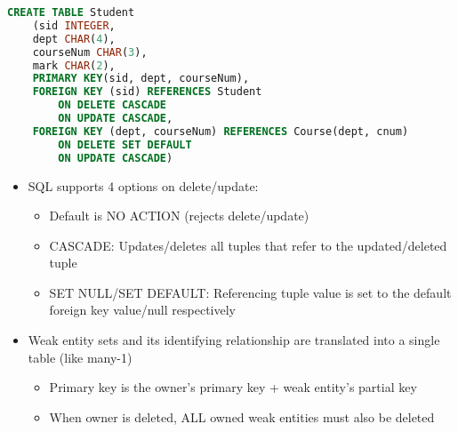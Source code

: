 \documentclass[8pt,landscape,a4paper, fleqn, dvipsnames]{extarticle}
\begin{document}
\begin{multicols*}{4}
\begin{itemize}
\end{itemize}
\begin{lstlisting}[language = SQL]
CREATE TABLE Student
    (sid INTEGER,
    dept CHAR(4),
    courseNum CHAR(3),
    mark CHAR(2),
    PRIMARY KEY(sid, dept, courseNum),
    FOREIGN KEY (sid) REFERENCES Student
        ON DELETE CASCADE
        ON UPDATE CASCADE,
    FOREIGN KEY (dept, courseNum) REFERENCES Course(dept, cnum)
        ON DELETE SET DEFAULT
        ON UPDATE CASCADE)
\end{lstlisting}
\begin{itemize}
    \item SQL supports 4 options on delete/update:
    \begin{itemize}
        \item Default is NO ACTION (rejects delete/update)
        \item CASCADE: Updates/deletes all tuples that refer to the updated/deleted tuple
        \item SET NULL/SET DEFAULT: Referencing tuple value is set to the default foreign key value/null respectively
    \end{itemize}
    \item Weak entity sets and its identifying relationship are translated into a single table (like many-1)
    \begin{itemize}
        \item Primary key is the owner's primary key + weak entity's partial key
        \item When owner is deleted, ALL owned weak entities must also be deleted
    \end{itemize}
\end{itemize}


\end{multicols*}
\end{document}
